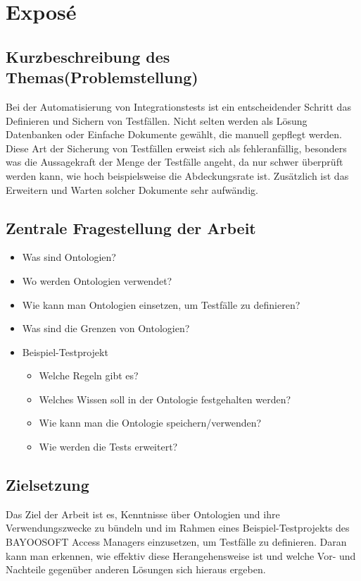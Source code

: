 	\chapter*{Exposé}
	\section*{Kurzbeschreibung des Themas(Problemstellung)}
    Bei der Automatisierung von Integrationstests ist ein entscheidender Schritt das Definieren und Sichern von Testfällen. Nicht selten werden als Lösung Datenbanken oder Einfache Dokumente gewählt, die manuell gepflegt werden. Diese Art der Sicherung von Testfällen erweist sich als fehleranfällig, besonders was die Aussagekraft der Menge der Testfälle angeht, da nur schwer überprüft werden kann, wie hoch beispielsweise die Abdeckungsrate ist. Zusätzlich ist das Erweitern und Warten solcher Dokumente sehr aufwändig. 
\section*{Zentrale Fragestellung der Arbeit}
\begin{itemize}
    \item Was sind Ontologien?
    \item Wo werden Ontologien verwendet?
    \item Wie kann man Ontologien einsetzen, um Testfälle zu definieren?
    \item Was sind die Grenzen von Ontologien?
    \item Beispiel-Testprojekt
    \begin{itemize}
        \item Welche Regeln gibt es?
        \item Welches Wissen soll in der Ontologie festgehalten werden?
        \item Wie kann man die Ontologie speichern/verwenden?
        \item Wie werden die Tests erweitert?
    \end{itemize}
\end{itemize}
\section*{Zielsetzung}
    Das Ziel der Arbeit ist es, Kenntnisse über Ontologien und ihre Verwendungszwecke zu bündeln und im Rahmen eines Beispiel-Testprojekts des BAYOOSOFT Access Managers einzusetzen, um Testfälle zu definieren. Daran kann man erkennen, wie effektiv diese Herangehensweise ist und welche Vor- und Nachteile gegenüber anderen Lösungen sich hieraus ergeben. 
